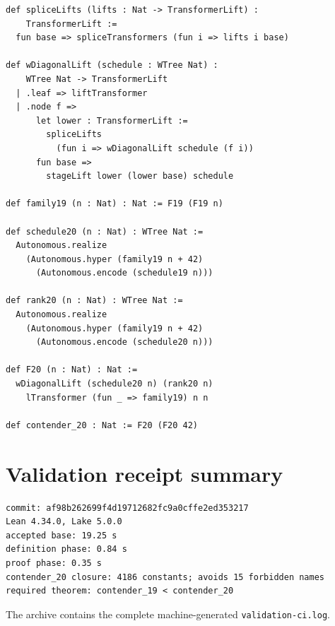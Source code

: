 \documentclass[11pt]{article}
\theoremstyle{definition}
\newcommand{\code}[1]{\texttt{#1}}
\begin{document}
\begin{lstlisting}
def spliceLifts (lifts : Nat -> TransformerLift) :
    TransformerLift :=
  fun base => spliceTransformers (fun i => lifts i base)

def wDiagonalLift (schedule : WTree Nat) :
    WTree Nat -> TransformerLift
  | .leaf => liftTransformer
  | .node f =>
      let lower : TransformerLift :=
        spliceLifts
          (fun i => wDiagonalLift schedule (f i))
      fun base =>
        stageLift lower (lower base) schedule

def family19 (n : Nat) : Nat := F19 (F19 n)

def schedule20 (n : Nat) : WTree Nat :=
  Autonomous.realize
    (Autonomous.hyper (family19 n + 42)
      (Autonomous.encode (schedule19 n)))

def rank20 (n : Nat) : WTree Nat :=
  Autonomous.realize
    (Autonomous.hyper (family19 n + 42)
      (Autonomous.encode (schedule20 n)))

def F20 (n : Nat) : Nat :=
  wDiagonalLift (schedule20 n) (rank20 n)
    lTransformer (fun _ => family19) n n

def contender_20 : Nat := F20 (F20 42)
\end{lstlisting}

\section{Validation receipt summary}

\begin{verbatim}
commit: af98b262699f4d19712682fc9a0cffe2ed353217
Lean 4.34.0, Lake 5.0.0
accepted base: 19.25 s
definition phase: 0.84 s
proof phase: 0.35 s
contender_20 closure: 4186 constants; avoids 15 forbidden names
required theorem: contender_19 < contender_20
\end{verbatim}
The archive contains the complete machine-generated \code{validation-ci.log}.
\end{document}
